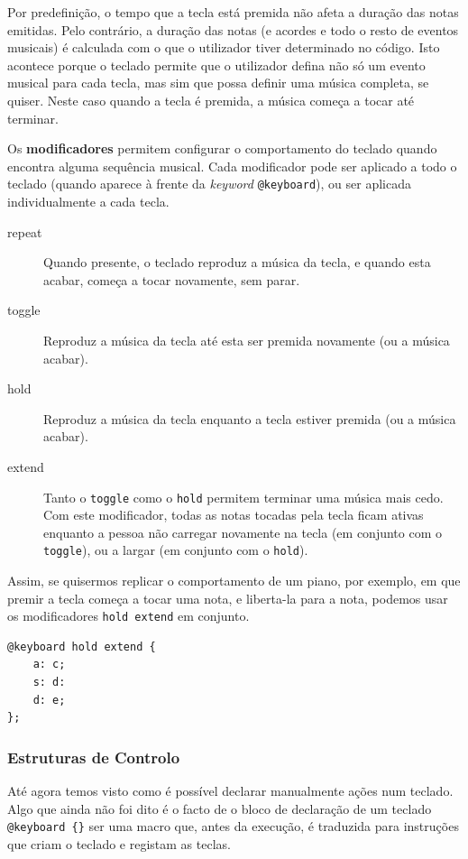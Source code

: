 Por predefinição, o tempo que a tecla está premida não afeta a duração das notas emitidas. Pelo contrário, a duração das notas (e acordes e todo o resto de eventos musicais) é calculada com o que o utilizador tiver determinado no código. Isto acontece porque o teclado permite que o utilizador defina não só um evento musical para cada tecla, mas sim que possa definir uma música completa, se quiser. Neste caso quando a tecla é premida, a música começa a tocar até terminar.

Os \textbf{modificadores} permitem configurar o comportamento do teclado quando encontra alguma sequência musical. Cada modificador pode ser aplicado a todo o teclado (quando aparece à frente da \textit{keyword} \texttt{@keyboard}), ou ser aplicada individualmente a cada tecla.

\begin{description}
 \item[repeat] Quando presente, o teclado reproduz a música da tecla, e quando esta acabar, começa a tocar novamente, sem parar.
 \item[toggle] Reproduz a música da tecla até esta ser premida novamente (ou a música acabar).
 \item[hold] Reproduz a música da tecla enquanto a tecla estiver premida (ou a música acabar).
 \item[extend] Tanto o \texttt{toggle} como o \texttt{hold} permitem terminar uma música mais cedo. Com este modificador, todas as notas tocadas pela tecla ficam ativas enquanto a pessoa não carregar novamente na tecla (em conjunto com o \texttt{toggle}), ou a largar (em conjunto com o \texttt{hold}).
\end{description}

Assim, se quisermos replicar o comportamento de um piano, por exemplo, em que premir a tecla começa a tocar uma nota, e liberta-la para a nota, podemos usar os modificadores \texttt{hold extend} em conjunto.

\begin{lstlisting}[caption={Aplicar o modificador \texttt{hold extend} a um teclado inteiro}]
@keyboard hold extend {
    a: c;
    s: d:
    d: e;
};
\end{lstlisting}

\subsubsection{Estruturas de Controlo}
Até agora temos visto como é possível declarar manualmente ações num teclado. Algo que ainda não foi dito é o facto de o bloco de declaração de um teclado \verb|@keyboard {}| ser uma macro que, antes da execução, é traduzida para instruções que criam o teclado e registam as teclas.

